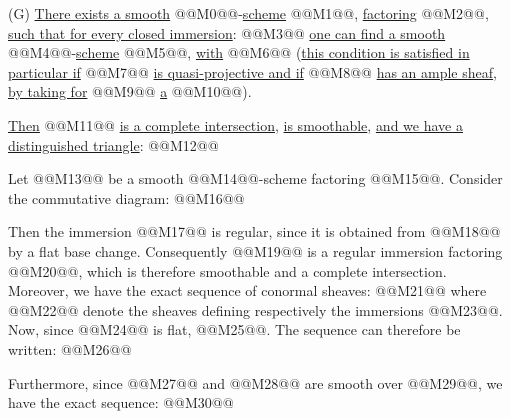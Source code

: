 (G) \uline{There
exists a smooth} @@M0@@-\uline{scheme} @@M1@@, \uline{factoring} @@M2@@, \uline{such that for every closed immersion}: @@M3@@ \uline{one can find a smooth} @@M4@@-\uline{scheme} @@M5@@, \uline{with} @@M6@@ (\uline{this condition is satisfied in particular if} @@M7@@ \uline{is quasi-projective and if} @@M8@@ \uline{has an ample sheaf}, \uline{by taking for} @@M9@@ \uline{a} @@M10@@).

\uline{Then} @@M11@@ \uline{is a complete intersection}, \uline{is smoothable}, \uline{and we have a distinguished triangle}:
@@M12@@

Let @@M13@@ be a smooth @@M14@@-scheme factoring @@M15@@. Consider the commutative diagram:
@@M16@@

Then the immersion @@M17@@ is regular, since it is obtained from @@M18@@ by a flat base change. Consequently @@M19@@ is a regular immersion factoring @@M20@@, which is therefore smoothable and a complete intersection. Moreover, we have the exact sequence of conormal sheaves:
@@M21@@
where @@M22@@ denote the sheaves defining respectively the immersions @@M23@@. Now, since @@M24@@ is flat, @@M25@@. The sequence can therefore be written:
@@M26@@

Furthermore, since @@M27@@ and @@M28@@ are smooth over @@M29@@, we have the exact sequence:
@@M30@@
